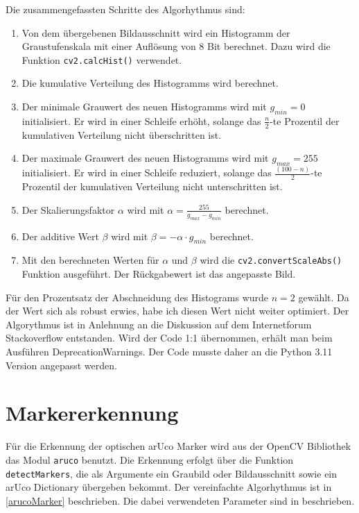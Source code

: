     Die zusammengefassten Schritte des Algorhythmus sind:
    \begin{enumerate}
        \item Von dem übergebenen Bildausschnitt wird ein Histogramm der Graustufenskala mit einer Auflösung von 8 Bit berechnet. Dazu wird die Funktion \verb|cv2.calcHist()| verwendet.
        \item Die kumulative Verteilung des Histogramms wird berechnet.
        \item Der minimale Grauwert des neuen Histogramms wird mit $g_{min} = 0$ initialisiert. Er wird in einer Schleife erhöht, solange das $\frac{n}{2}$-te Prozentil der kumulativen Verteilung nicht überschritten ist.
        \item Der maximale Grauwert des neuen Histogramms wird mit $g_{max} = 255$ initialisiert. Er wird in einer Schleife reduziert, solange das $\frac{(100-n)}{2}$-te Prozentil der kumulativen Verteilung nicht unterschritten ist.
        \item Der Skalierungsfaktor $\alpha$ wird mit $\alpha = \frac{255}{g_{max} - g_{min}}$ berechnet.
        \item Der additive Wert $\beta$ wird mit $\beta = -\alpha \cdot g_{min}$ berechnet.
        \item Mit den berechneten Werten für $\alpha$ und $\beta$ wird die \verb|cv2.convertScaleAbs()| Funktion ausgeführt. Der Rückgabewert ist das angepasste Bild.
    \end{enumerate}

    Für den Prozentsatz der Abschneidung des Histograms wurde $n=2$ gewählt. Da der Wert sich als robust erwies, habe ich diesen Wert nicht weiter optimiert.
    Der Algorythmus ist in Anlehnung an die Diskussion auf dem Internetforum Stackoverflow \cite{SOcontrast} entstanden. 
    Wird der Code 1:1 übernommen, erhält man beim Ausführen DeprecationWarnings. Der Code musste daher an die Python 3.11 Version angepasst werden. 
    
    \clearpage
    
    \clearpage

    \section {Markererkennung}

    Für die Erkennung der optischen arUco Marker wird aus der OpenCV Bibliothek das Modul \verb|aruco| benutzt. 
    Die Erkennung erfolgt über die Funktion \verb|detectMarkers|, die als Argumente ein Graubild oder Bildausschnitt sowie ein arUco Dictionary übergeben bekommt.
    Der vereinfachte Algorhythmus ist in \ref{arucoMarker} beschrieben. Die dabei verwendeten Parameter sind in \cite{OpenCVaruco} beschrieben.
    
